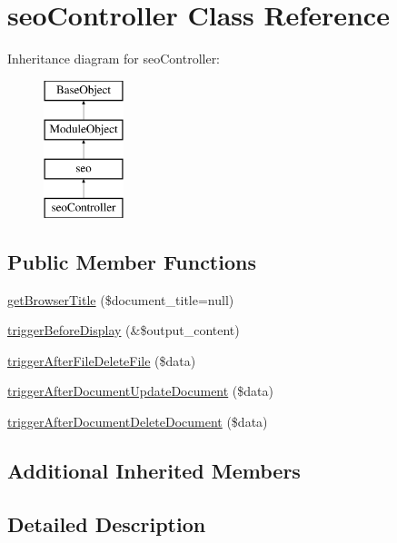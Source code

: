 \hypertarget{classseoController}{\section{seo\-Controller Class Reference}
\label{classseoController}
}
Inheritance diagram for seo\-Controller\-:\begin{figure}[H]
\begin{center}
\leavevmode
\includegraphics[height=4.000000cm]{classseoController}
\end{center}
\end{figure}
\subsection*{Public Member Functions}
\begin{DoxyCompactItemize}
\item 
\hyperlink{classseoController_aebcfc26f601c864e30ff68eb1d980748}{get\-Browser\-Title} (\$document\-\_\-title=null)
\item 
\hyperlink{classseoController_a5fc849127994dd2007a31f970ddce6b1}{trigger\-Before\-Display} (\&\$output\-\_\-content)
\item 
\hyperlink{classseoController_afe52804e4a5299502180aedafba58b49}{trigger\-After\-File\-Delete\-File} (\$data)
\item 
\hyperlink{classseoController_a152e68565c0c6f9ebc8570b00d68723e}{trigger\-After\-Document\-Update\-Document} (\$data)
\item 
\hyperlink{classseoController_af3d44be198fca520becbd084c3760e72}{trigger\-After\-Document\-Delete\-Document} (\$data)
\end{DoxyCompactItemize}
\subsection*{Additional Inherited Members}


\subsection{Detailed Description}


